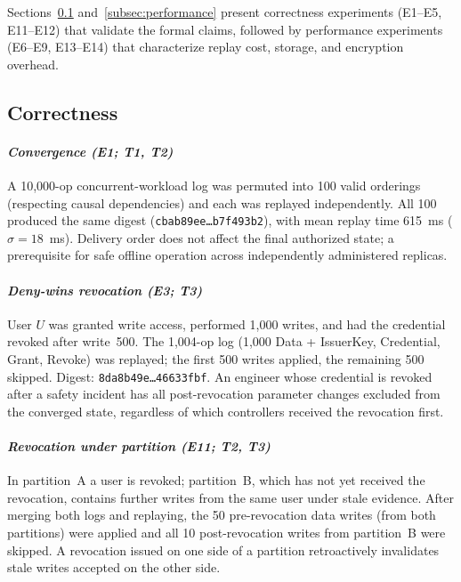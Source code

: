 \documentclass[10pt,journal,compsoc]{IEEEtran}
\begin{document}
Sections~\ref{subsec:correctness}
and~\ref{subsec:performance} present correctness experiments
(E1--E5, E11--E12) that validate the formal claims, followed
by performance experiments (E6--E9, E13--E14) that characterize
replay cost, storage, and encryption overhead.

\subsection{Correctness}\label{subsec:correctness}

\paragraph*{\textbf{\textit{Convergence (E1; T1, T2)}}}
A 10{,}000-op concurrent-workload log was permuted into 100 valid orderings (respecting causal dependencies) and each was replayed independently. All 100 produced the same digest (\texttt{\small cbab89ee\ldots b7f493b2}), with mean replay time 615~ms ($\sigma=18$~ms). Delivery order does not affect the final authorized state; a prerequisite for safe offline operation across independently administered replicas.

\paragraph*{\textbf{\textit{Deny-wins revocation (E3; T3)}}}
User $U$ was granted write access, performed 1{,}000 writes, and had the credential revoked after write~500. The 1{,}004-op log (1{,}000 Data + IssuerKey, Credential, Grant, Revoke) was replayed; the first 500 writes applied, the remaining 500 skipped. Digest: \texttt{\small 8da8b49e\ldots 46633fbf}. An engineer whose credential is revoked after a safety incident has all post-revocation parameter changes excluded from the converged state, regardless of which controllers received the revocation first.

\paragraph*{\textbf{\textit{Revocation under partition (E11; T2, T3)}}}
In partition~A a user is revoked; partition~B, which has not yet received the revocation, contains further writes from the same user under stale evidence. After merging both logs and replaying, the 50 pre-revocation data writes (from both partitions) were applied and all 10 post-revocation writes from partition~B were skipped. A revocation issued on one side of a partition retroactively invalidates stale writes accepted on the other side.
\end{document}
